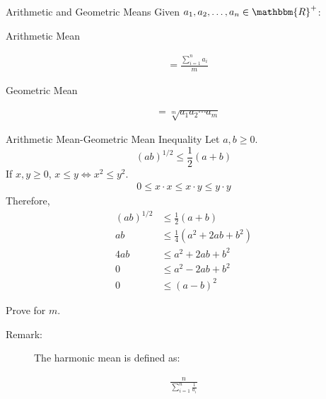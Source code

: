 \documentclass[10pt]{extarticle}
\newcommand{\R}{\mathbbm{R}}
\begin{document}
  \begin{problem}{Arithmetic and Geometric Means}
    Given $a_1,a_2,\dots,a_n\in \R^+$:
    \begin{description}
      \item[Arithmetic Mean]
    \end{description}
    \begin{align*}
      &= \frac{\sum_{i =1}^{n} a_i}{m}
    \end{align*}
    \begin{description}
      \item[Geometric Mean]
    \end{description}
    \begin{align*}
      &= \sqrt[m]{a_1a_2\cdots a_m}
    \end{align*}
    \begin{problem}{Arithmetic Mean-Geometric Mean Inequality}
      Let $a,b \geq 0$.
      \[
        (ab)^{1/2} \leq \frac{1}{2}(a+b)
      \] 
      \tcblower
      If $x,y \geq 0$, $x\leq y \Leftrightarrow x^2 \leq y^2$.
      \begin{align*}
          0 \leq x\cdot x \leq x \cdot y \leq y\cdot y\tag*{by property (ii) of ordered fields}
      \end{align*}
      Therefore,  
      \begin{align*}
        (ab)^{1/2}&\leq \frac{1}{2}(a+b)\\
        ab &\leq \frac{1}{4}(a^2 + 2ab + b^2)\\
        4ab &\leq a^2 + 2ab + b^2 \\
        0 &\leq a^2 - 2ab + b^2\\
        0 &\leq (a-b)^2 \tag*{by definition}
      \end{align*}
      \begin{description}
        \small
        \item[Challenge:] Prove for $m$.
      \end{description}
    \end{problem}
    \begin{description}
      \item[Remark:] The harmonic mean is defined as:
    \end{description}
    \begin{align*}
      \frac{n}{\displaystyle\sum_{i=1}^{n}\frac{1}{a_i}}
    \end{align*}
  \end{problem}
\end{document}
